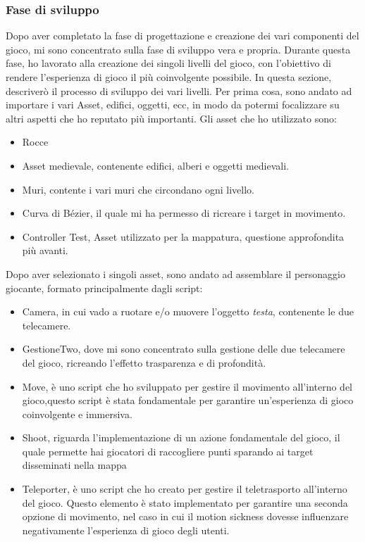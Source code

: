 \documentclass[
a4paper,
cleardoublepage=empty,
headings=twolinechapter,
numbers=autoenddot,
]{scrbook}
\begin{document}
    \subsubsection{Fase di sviluppo}
    Dopo aver completato la fase di progettazione e creazione dei vari componenti del gioco, mi sono concentrato sulla fase di sviluppo vera e propria. Durante questa fase, ho lavorato alla creazione dei singoli livelli del gioco, con l'obiettivo di rendere l'esperienza di gioco il più coinvolgente possibile. In questa sezione, descriverò il processo di sviluppo dei vari livelli.
    Per prima cosa, sono andato ad importare i vari Asset, edifici, oggetti, ecc, in modo da potermi focalizzare su altri aspetti che ho reputato più importanti.
    Gli asset che ho utilizzato sono:
    \begin{itemize}
    	\item Rocce\cite{Rock_asset}
    	\item Asset medievale\cite{Pack_asset}, contenente edifici, alberi e oggetti medievali. 
    	\item Muri\cite{Wall_asset}, contente i vari muri che circondano ogni livello.
    	\item Curva di Bézier\cite{Pack_asset}, il quale mi ha permesso di ricreare i target in movimento.
    	\item Controller Test\cite{Controller_test}, Asset utilizzato per la mappatura, questione approfondita più avanti.
    \end{itemize}
    Dopo aver selezionato i singoli asset, sono andato ad assemblare il personaggio giocante, formato principalmente dagli script:
    \begin{itemize}
        \item Camera, in cui vado a ruotare e/o muovere l'oggetto \textit{testa}, contenente le due telecamere.
        \item GestioneTwo, dove mi sono concentrato sulla gestione delle due telecamere del gioco, ricreando l'effetto trasparenza e di profondità.
        \item Move, è uno script che ho sviluppato per gestire il movimento all'interno del gioco,questo script è stata fondamentale per garantire un'esperienza di gioco coinvolgente e immersiva.
        \item Shoot, riguarda l'implementazione di un azione fondamentale del gioco, il quale permette hai giocatori di raccogliere punti sparando ai target disseminati nella mappa
        \item Teleporter, è uno script che ho creato per gestire il teletrasporto all'interno del gioco. Questo elemento è stato implementato per garantire una seconda opzione di movimento, nel caso in cui il motion sickness\cite{mottion_sickness} dovesse influenzare negativamente l'esperienza di gioco degli utenti.
    \end{itemize}
\end{document}
